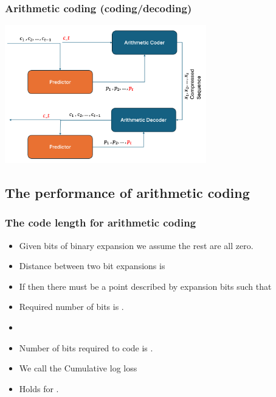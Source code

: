 \documentclass{beamer}
\begin{document}
\begin{frame}
  \frametitle{Arithmetic coding  (coding/decoding)}
\includegraphics[height=6cm]{figures/codeDecode/Slide1.png}

\end{frame}



\subsection{The performance of arithmetic coding}

\begin{frame}
\frametitle{The code length for arithmetic coding}
\begin{itemize}
\item Given  bits of binary expansion we assume the rest are all zero.
\item Distance between two  bit expansions is 
\item If  then there must be a point  described by  expansion bits such that 
\item Required number of bits is .
\item {}
\item Number of bits required to code  is
.
\item We call  the {\color{blue} Cumulative log loss}
\item Holds for .
\end{itemize}
\end{frame}
\end{document}
